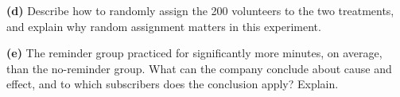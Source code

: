 \documentclass[12pt]{article}
\begin{document}
\begin{enumerate}[leftmargin=1.9em, itemsep=0.16in, resume]
        \vspace{6pt}
        \boxguard[16]
        \textbf{(d)} Describe how to randomly assign the 200 volunteers to the two treatments,
        and explain why random assignment matters in this experiment.\\[4pt]

        \vspace{6pt}
        \boxguard[17]
        \textbf{(e)} The reminder group practiced for significantly more minutes, on average,
        than the no-reminder group. What can the company conclude about cause and effect, and
        to which subscribers does the conclusion apply? Explain.\\[4pt]

\end{enumerate}
\end{document}
